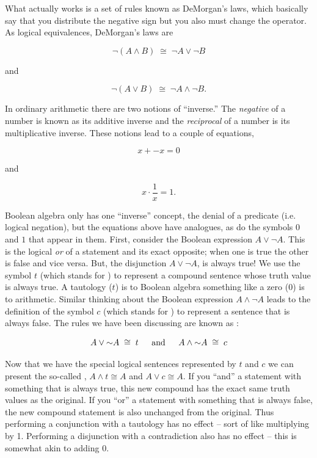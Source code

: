What actually works is a set of rules known as 
DeMorgan's laws, which
basically say that you distribute the negative sign but
you also must change the operator.  As logical equivalences,
DeMorgan's laws are 

\[ {\lnot}(A \land B) \; \cong \; {\lnot}A \lor {\lnot}B \]

\noindent and

\[ {\lnot}(A \lor B) \; \cong \; {\lnot}A \land {\lnot}B. \]

In ordinary arithmetic there are two notions of ``inverse.''  The 
{\em negative} of a number is known as its additive inverse and
the {\em reciprocal} of a number is its multiplicative inverse.
These notions lead to a couple of equations,

\[ x + -x = 0 \]

\noindent and

\[ x \cdot \frac{1}{x} = 1. \]

\noindent Boolean algebra only has one ``inverse'' concept, the denial
 of a predicate (i.e. logical negation), but the equations above have analogues, as do
the symbols $0$ and $1$ that appear in them.  First, consider
the Boolean expression $A \lor {\lnot}A$.  This is the logical {\em or}
of a statement and its exact opposite; when one is true the other is 
false and vice versa.  But, the disjunction $A \lor {\lnot}A$, is 
always true!  We use the symbol $t$ (which stands for 
)
to represent a compound sentence whose truth value is always true.
A tautology ($t$) is to Boolean algebra something like a zero ($0$)
is to arithmetic.  Similar thinking about the Boolean expression
  $A \land {\lnot}A$ leads to the definition of the symbol $c$ (which
stands for ) to 
represent a sentence that is always
false.  The rules we have been discussing are known as 
:

\[ A \lor {\lnot}A \; \cong \; t \mbox{\rule{12pt}{0pt} and \rule{12pt}{0pt}}
A \land {\lnot}A \; \cong \; c \]


Now that we have the special logical sentences represented by $t$ and $c$
we can present the so-called , 
$A \land t \cong A$ and
$A \lor c \cong A$.  If you ``and'' a statement with something that is always
true, this new compound has the exact same truth values as the original.
If you ``or'' a statement with something that is always false, the new compound
statement is also unchanged from the original.  Thus performing a 
conjunction with a tautology has no effect -- sort of like multiplying by 1.
Performing a disjunction with a contradiction also has no effect -- this is
somewhat akin to adding 0. 

